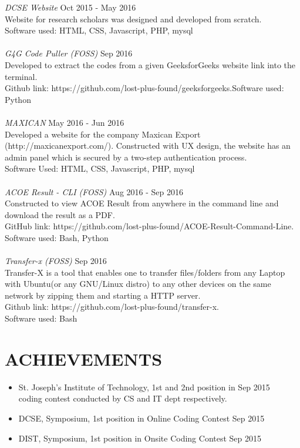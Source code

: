 \documentclass[margin, 10pt]{res} %
\begin{document}
\begin{resume}
 
{\sl DCSE Website} \hfill Oct 2015 - May 2016 \\
Website for research scholars was designed and developed from scratch. \\
Software used: HTML, CSS, Javascript, PHP, mysql  \\
\\
{\sl G4G Code Puller (FOSS)} \hfill Sep 2016 \\
Developed to extract the codes from a given GeeksforGeeks website link into the terminal.\\
Github link: https://github.com/lost-plus-found/geeksforgeeks.Software used: Python \\
\\
{\sl MAXICAN } \hfill May 2016 - Jun 2016 \\
Developed a website for the company Maxican Export (http://maxicanexport.com/). Constructed with UX design, the website has an admin panel which is secured by a two-step authentication process.  \\
Software Used: HTML, CSS, Javascript, PHP, mysql \\
\\
{\sl ACOE Result - CLI (FOSS)} \hfill Aug 2016 - Sep 2016 \\
Constructed to view ACOE Result from anywhere in the command line and download the result as a PDF. \\
GitHub link: https://github.com/lost-plus-found/ACOE-Result-Command-Line. \\ 
Software used: Bash, Python \\
\\
{\sl Transfer-x (FOSS)} \hfill Sep 2016 \\
Transfer-X is a tool that enables one to transfer files/folders from any Laptop with Ubuntu(or any GNU/Linux distro) to any other devices on the same network by zipping them and starting a HTTP server. \\ Github link: https://github.com/lost-plus-found/transfer-x. \\
Software used: Bash \\

\section{ACHIEVEMENTS}
\begin{itemize} 
\item St. Joseph's Institute of Technology, 1st and 2nd position in \hfill Sep 2015 \\ coding contest conducted by CS and IT dept respectively.
\item DCSE, Symposium, 1st position in Online Coding Contest \hfill Sep 2015
\item DIST, Symposium, 1st position in Onsite Coding Contest \hfill Sep 2015
\end{itemize}


\end{resume}
\end{document}
